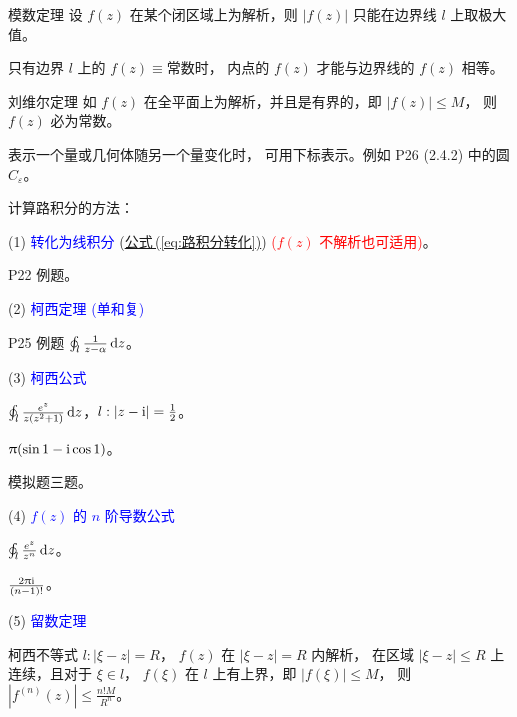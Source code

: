 \documentclass[12pt, a4paper, oneside, UTF8]{ctexbook}
\begin{document}
\begin{corollary}{模数定理}{}
    设 $f(z)$ 在某个闭区域上为解析，则 $\left\lvert f(z)\right\rvert $ 只能在边界线 $l$ 上取极大值。
\end{corollary}
\noindent {} 只有边界 $l$ 上的 $f(z)\equiv \mbox{常数}$时，
内点的 $f(z)$ 才能与边界线的 $f(z)$ 相等。

\begin{corollary}{刘维尔定理}{}
    如 $f(z)$ 在全平面上为解析，并且是有界的，即 $\left\lvert f(z)\right\rvert \leqslant M$，
    则 $f(z)$ 必为常数。
\end{corollary}

\noindent {} 表示一个量或几何体随另一个量变化时，
可用下标表示。例如 P26 (2.4.2) 中的圆 $C_\varepsilon$。

\noindent {} 计算路积分的方法：

(1) \textcolor{blue}{转化为线积分} (\hyperref[eq:路积分转化]{公式\,(\ref{eq:路积分转化})}) 
\textcolor{red}{($f(z)$ 不解析也可适用)}。
\begin{example}{}
    P22 例题。
\end{example}
(2) \textcolor{blue}{柯西定理 (单和复)}
\begin{example}{}
    P25 例题 $\oint_{l} \frac{1}{z-\alpha} \mathop{}\!\mathrm{d} z$。
\end{example}
(3) \textcolor{blue}{柯西公式}
\begin{example}{}
    $\oint_{l} \frac{e^z}{z(z^2+1)} \mathop{}\!\mathrm{d} z$，$l:\left\lvert z-\mathrm{i} \right\rvert = \frac{1}{2}$。
\end{example}
\begin{solution}{}
    $\uppi (\sin 1 - \mathrm{i}\cos 1)$。
\end{solution}
\begin{example}{}
    模拟题三题。
\end{example}
(4) \textcolor{blue}{$f(z)$ 的 $n$ 阶导数公式}
\begin{example}{}
    $\oint_{l} \frac{e^z}{z^n} \mathop{}\!\mathrm{d} z$。
\end{example}
\begin{solution}{}
    $\frac{2\uppi \mathrm{i}}{(n-1)!}$。
\end{solution}
(5) \textcolor{blue}{留数定理}

\begin{corollary}{柯西不等式}{}
    $l: \left\lvert \xi-z \right\rvert = R$，
    $f(z)$ 在 $\left\lvert \xi-z \right\rvert = R$ 内解析，
    在区域 $\left\lvert \xi-z \right\rvert \leqslant R$ 上连续，且对于 $\xi\in l$，
    $f(\xi)$ 在 $l$ 上有上界，即 $\left\lvert f(\xi) \right\rvert \leqslant M$，
    则 $\left\lvert f^{(n)}(z) \right\rvert \leqslant \frac{n! M}{R^n}$。
\end{corollary}
\end{document}
